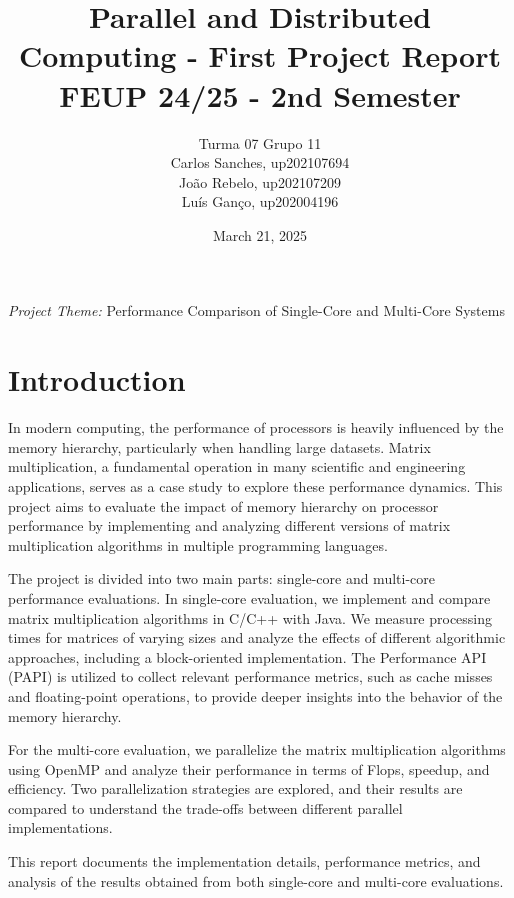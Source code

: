 \documentclass{article}
\title{Parallel and Distributed Computing - First Project Report \\ FEUP 24/25 - 2nd Semester}
\author{
Turma 07 Grupo 11 \\
Carlos Sanches, up202107694 \\
João Rebelo, up202107209 \\
Luís Ganço, up202004196
}
\date{March 21, 2025}
\begin{document}
\newpage 
\vspace{0.in}

\maketitle
\begin{center}
    \large \textit{Project Theme:} Performance Comparison of Single-Core and Multi-Core Systems
\end{center}
\vspace{1.3in}
\tableofcontents
\newpage %

\section{Introduction}

In modern computing, the performance of processors is heavily influenced by the memory hierarchy, particularly when handling large datasets. Matrix multiplication, a fundamental operation in many scientific and engineering applications, serves as a case study to explore these performance dynamics. This project aims to evaluate the impact of memory hierarchy on processor performance by implementing and analyzing different versions of matrix multiplication algorithms in multiple programming languages.

The project is divided into two main parts: single-core and multi-core performance evaluations. In single-core evaluation, we implement and compare matrix multiplication algorithms in C/C++ with Java. We measure processing times for matrices of varying sizes and analyze the effects of different algorithmic approaches, including a block-oriented implementation. The Performance API (PAPI) is utilized to collect relevant performance metrics, such as cache misses and floating-point operations, to provide deeper insights into the behavior of the memory hierarchy.

For the multi-core evaluation, we parallelize the matrix multiplication algorithms using OpenMP and analyze their performance in terms of Flops, speedup, and efficiency. Two parallelization strategies are explored, and their results are compared to understand the trade-offs between different parallel implementations.

This report documents the implementation details, performance metrics, and analysis of the results obtained from both single-core and multi-core evaluations. 
\end{document}
